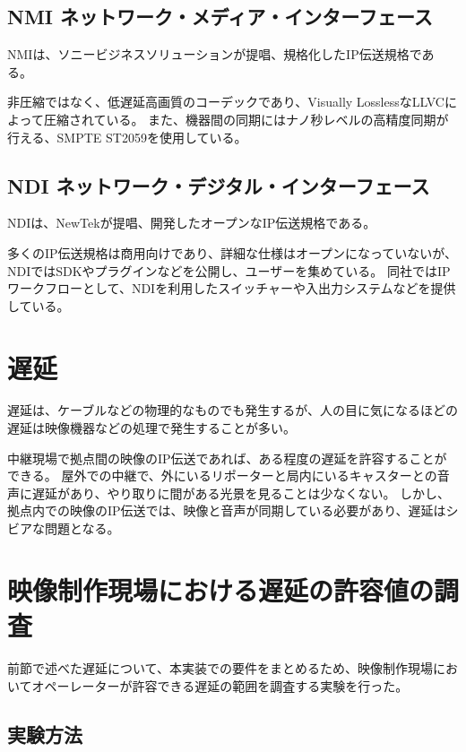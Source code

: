 \subsection{NMI ネットワーク・メディア・インターフェース}
NMI\cite{sony-nmi}は、ソニービジネスソリューションが提唱、規格化したIP伝送規格である。

非圧縮ではなく、低遅延高画質のコーデックであり、Visually LosslessなLLVC\cite{smpte-rdd-34}によって圧縮されている。
また、機器間の同期にはナノ秒レベルの高精度同期が行える、SMPTE ST2059を使用している。

\subsection{NDI ネットワーク・デジタル・インターフェース}
NDI\cite{newtek-ndi}は、NewTekが提唱、開発したオープンなIP伝送規格である。

多くのIP伝送規格は商用向けであり、詳細な仕様はオープンになっていないが、NDIではSDKやプラグインなどを公開し、ユーザーを集めている。
同社ではIPワークフローとして、NDIを利用したスイッチャーや入出力システムなどを提供している。

\section{遅延}

遅延は、ケーブルなどの物理的なものでも発生するが、人の目に気になるほどの遅延は映像機器などの処理で発生することが多い。

中継現場で拠点間の映像のIP伝送であれば、ある程度の遅延を許容することができる。
屋外での中継で、外にいるリポーターと局内にいるキャスターとの音声に遅延があり、やり取りに間がある光景を見ることは少なくない。
しかし、拠点内での映像のIP伝送では、映像と音声が同期している必要があり、遅延はシビアな問題となる。

\section{映像制作現場における遅延の許容値の調査}

前節で述べた遅延について、本実装での要件をまとめるため、映像制作現場においてオペーレーターが許容できる遅延の範囲を調査する実験を行った。

\subsection{実験方法}

